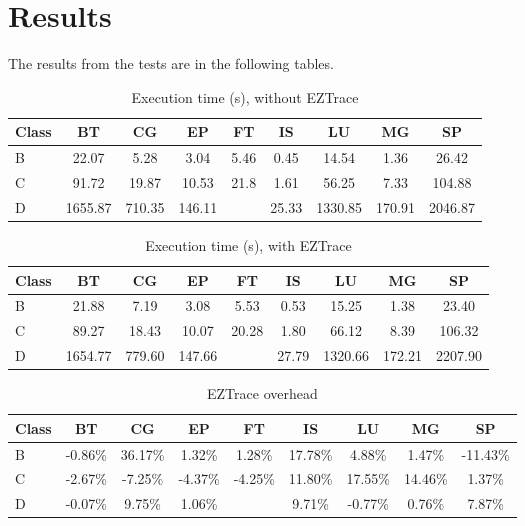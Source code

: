 \documentclass[12pt]{article}
\begin{document}
\section{Results}

The results from the tests are in the following tables. 

\begin{table}[H]
\centering
\caption{Execution time (s), without EZTrace}
\label{tab:notrace}
\begin{tabular}{|l|cccccccc|}
\hline
Class & BT      & CG     & EP     & FT   & IS    & LU      & MG     & SP      \\ \hline
B     & 22.07   & 5.28   & 3.04   & 5.46 & 0.45  & 14.54   & 1.36   & 26.42   \\
C     & 91.72   & 19.87  & 10.53  & 21.8 & 1.61  & 56.25   & 7.33   & 104.88  \\
D     & 1655.87 & 710.35 & 146.11 &      & 25.33 & 1330.85 & 170.91 & 2046.87 \\
\hline
\end{tabular}
\end{table}

\begin{table}[H]
\centering
\caption{Execution time (s), with EZTrace}
\label{tab:eztrace}
\begin{tabular}{|l|cccccccc|}
\hline
Class & BT      & CG     & EP     & FT    & IS    & LU      & MG     & SP      \\ \hline
B     & 21.88   & 7.19   & 3.08   & 5.53  & 0.53  & 15.25   & 1.38   & 23.40   \\
C     & 89.27   & 18.43  & 10.07  & 20.28 & 1.80  & 66.12   & 8.39   & 106.32  \\
D     & 1654.77 & 779.60 & 147.66 &       & 27.79 & 1320.66 & 172.21 & 2207.90 \\
\hline
\end{tabular}
\end{table}

\begin{table}[H]
\centering
\caption{EZTrace overhead}
\label{tab:overhead}
\begin{tabular}{|l|cccccccc|}
\hline
Class & BT      & CG      & EP      & FT      & IS      & LU      & MG      & SP       \\ \hline
B     & -0.86\% & 36.17\% & 1.32\%  & 1.28\%  & 17.78\% & 4.88\%  & 1.47\%  & -11.43\% \\
C     & -2.67\% & -7.25\% & -4.37\% & -4.25\% & 11.80\% & 17.55\% & 14.46\% & 1.37\%   \\
D     & -0.07\% & 9.75\%  & 1.06\%  &         & 9.71\%  & -0.77\% & 0.76\%  & 7.87\%   \\
\hline
\end{tabular}
\end{table}
\end{document}
